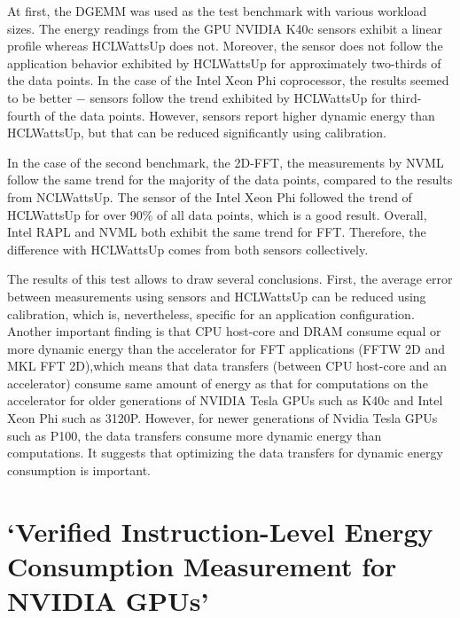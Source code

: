 At first, the DGEMM was used as the test benchmark with various
workload sizes. The energy readings from the GPU NVIDIA K40c
sensors exhibit a linear profile whereas HCLWattsUp does not.
Moreover, the sensor does not follow the application behavior
exhibited by HCLWattsUp for approximately two-thirds of the data
points. In the case of the Intel Xeon Phi coprocessor, the results
seemed to be better $-$ sensors follow the trend exhibited by
HCLWattsUp for third-fourth of the data points. However, sensors
report higher dynamic energy than HCLWattsUp, but that can be
reduced significantly using calibration.

In the case of the second benchmark, the 2D-FFT, the measurements
by NVML follow the same trend for the majority of the data points,
compared to the results from NCLWattsUp. The sensor of the Intel
Xeon Phi followed the trend of HCLWattsUp for over 90\% of all
data points, which is a good result. Overall, Intel RAPL and NVML
both exhibit the same trend for FFT\@. Therefore, the difference
with HCLWattsUp comes from both sensors collectively.

The results of this test allows to draw several conclusions.
First, the average error between measurements using sensors and
HCLWattsUp can be reduced using calibration, which is,
nevertheless, specific for an application configuration. Another
important finding is that CPU host-core and DRAM consume equal
or more dynamic energy than the accelerator for FFT applications
(FFTW 2D and MKL FFT 2D),which means that data transfers (between
CPU host-core and an accelerator) consume same amount of energy
as that for computations on the accelerator for older generations
of NVIDIA Tesla GPUs such as K40c and Intel Xeon Phi such as 3120P.
However, for newer generations of Nvidia Tesla GPUs such as P100,
the data transfers consume more dynamic energy than computations.
It suggests that optimizing the data transfers for dynamic energy
consumption is important.

\section{`Verified Instruction-Level Energy Consumption Measurement
for NVIDIA GPUs'}

